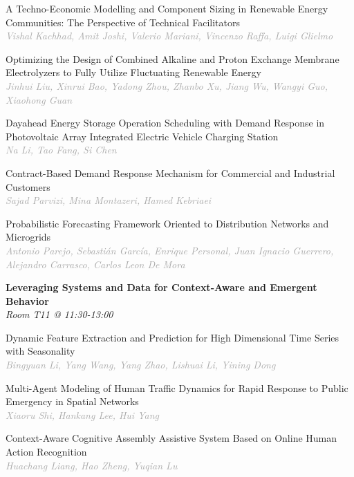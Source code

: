 \begin{multicols*}{2}
\small A Techno-Economic Modelling and Component Sizing in Renewable Energy Communities: The Perspective of Technical Facilitators\\ 
\footnotesize \textcolor{darkgray}{\textit{Vishal Kachhad, Amit  Joshi, Valerio  Mariani, Vincenzo  Raffa, Luigi  Glielmo}}

\small Optimizing the Design of Combined Alkaline and Proton Exchange Membrane Electrolyzers to Fully Utilize Fluctuating Renewable Energy\\ 
\footnotesize \textcolor{darkgray}{\textit{Jinhui Liu, Xinrui  Bao, Yadong  Zhou, Zhanbo  Xu, Jiang  Wu, Wangyi  Guo, Xiaohong  Guan}}

\small Dayahead Energy Storage Operation Scheduling with Demand Response in Photovoltaic Array Integrated Electric Vehicle Charging Station\\ 
\footnotesize \textcolor{darkgray}{\textit{Na Li, Tao  Fang, Si  Chen}}

\small Contract-Based Demand Response Mechanism for Commercial and Industrial Customers\\ 
\footnotesize \textcolor{darkgray}{\textit{Sajad Parvizi, Mina  Montazeri, Hamed  Kebriaei}}

\small Probabilistic Forecasting Framework Oriented to Distribution Networks and Microgrids\\ 
\footnotesize \textcolor{darkgray}{\textit{Antonio Parejo, Sebastián  García, Enrique  Personal, Juan Ignacio  Guerrero, Alejandro  Carrasco, Carlos  Leon De Mora}}

\normalsize \textbf{Leveraging Systems and Data for Context-Aware and Emergent Behavior}\\
\small \textit{Room T11 @ 11:30-13:00}

\small Dynamic Feature Extraction and Prediction for High Dimensional Time Series with Seasonality\\ 
\footnotesize \textcolor{darkgray}{\textit{Bingyuan Li, Yang  Wang, Yang  Zhao, Lishuai  Li, Yining  Dong}}

\small Multi-Agent Modeling of Human Traffic Dynamics for Rapid Response to Public Emergency in Spatial Networks\\ 
\footnotesize \textcolor{darkgray}{\textit{Xiaoru Shi, Hankang  Lee, Hui  Yang}}

\small Context-Aware Cognitive Assembly Assistive System Based on Online Human Action Recognition\\ 
\footnotesize \textcolor{darkgray}{\textit{Huachang Liang, Hao  Zheng, Yuqian  Lu}}


\end{multicols*}
